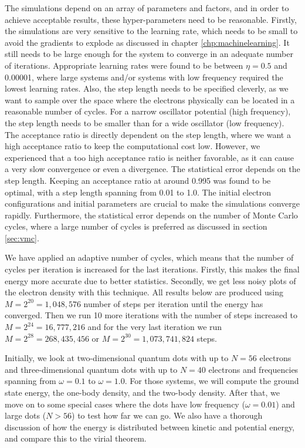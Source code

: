 The simulations depend on an array of parameters and factors, and in order to achieve acceptable results, these hyper-parameters need to be reasonable. Firstly, the simulations are very sensitive to the learning rate, which needs to be small to avoid the gradients to explode as discussed in chapter \ref{chp:machinelearning}. It still needs to be large enough for the system to converge in an adequate number of iterations. Appropriate learning rates were found to be between $\eta=0.5$ and 0.00001, where large systems and/or systems with low frequency required the lowest learning rates. Also, the step length needs to be specified cleverly, as we want to sample over the space where the electrons physically can be located in a reasonable number of cycles. For a narrow oscillator potential (high frequency), the step length needs to be smaller than for a wide oscillator (low frequency). The acceptance ratio is directly dependent on the step length, where we want a high acceptance ratio to keep the computational cost low. However, we experienced that a too high acceptance ratio is neither favorable, as it can cause a very slow convergence or even a divergence. The statistical error depends on the step length. Keeping an acceptance ratio at around 0.995 was found to be optimal, with a step length spanning from 0.01 to 1.0. The initial electron configurations and initial parameters are crucial to make the simulations converge rapidly. Furthermore, the statistical error depends on the number of Monte Carlo cycles, where a large number of cycles is preferred as discussed in section \ref{sec:vmc}. 

We have applied an adaptive number of cycles, which means that the number of cycles per iteration is increased for the last iterations. Firstly, this makes the final energy more accurate due to better statistics. Secondly, we get less noisy plots of the electron density with this technique. All results below are produced using $M=2^{20}=1,048,576$ number of steps per iteration until the energy has converged. Then we run 10 more iterations with the number of steps increased to $M=2^{24}=16,777,216$ and for the very last iteration we run $M=2^{28}=268,435,456$ or $M=2^{30}=1,073,741,824$ steps.

Initially, we look at two-dimensional quantum dots with up to $N=56$ electrons and three-dimensional quantum dots with up to $N=40$ electrons and frequencies spanning from  $\omega=0.1$ to $\omega=1.0$. For those systems, we will compute the ground state energy, the one-body density, and the two-body density. After that, we move on to some special cases where the dots have low frequency ($\omega=0.01$) and large dots ($N>56$) to test how far we can go. We also have a thorough discussion of how the energy is distributed between kinetic and potential energy, and compare this to the virial theorem.


